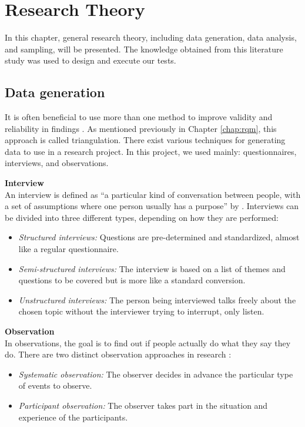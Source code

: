 \section{Research Theory}
\label{chap:research_theory}

In this chapter, general research theory, including data generation, data analysis, and sampling, will be presented. The knowledge obtained from this literature study was used to design and execute our tests. 

\subsection{Data generation}
It is often beneficial to use more than one method to improve validity and reliability in findings \citep{oates_researching_2006}. As mentioned previously in Chapter \ref{chap:rqm}, this approach is called triangulation. There exist various techniques for generating data to use in a research project. In this project, we used mainly: questionnaires, interviews, and observations.

\textbf{Interview} \\
An interview is defined as “a particular kind of conversation between people, with a set of assumptions where one person usually has a purpose” by \citeauthor{oates_researching_2006}. Interviews can be divided into three different types, depending on how they are performed:
\begin{itemize}
    \item \textit{Structured interviews:} Questions are pre-determined and standardized, almost like a regular questionnaire.
    \item \textit{Semi-structured interviews:} The interview is based on a list of themes and questions to be covered but is more like a standard conversion. 
    \item \textit{Unstructured interviews:} The person being interviewed talks freely about the chosen topic without the interviewer trying to interrupt, only listen.
\end{itemize}

\textbf{Observation} \\
In observations, the goal is to find out if people actually do what they say they do. There are two distinct observation approaches in research \citep{oates_researching_2006}:
\begin{itemize}
    \item \textit{Systematic observation:} The observer decides in advance the particular type of events to observe.
    \item \textit{Participant observation:} The observer takes part in the situation and experience of the participants.
\end{itemize}

